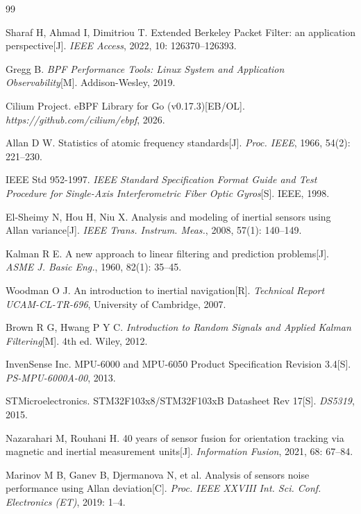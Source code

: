 \documentclass{rjthesis}
\begin{document}
\begin{thebibliography}{99}

 Sharaf H, Ahmad I, Dimitriou T. Extended Berkeley Packet Filter: an application perspective[J]. \textit{IEEE Access}, 2022, 10: 126370--126393.

 Gregg B. \textit{BPF Performance Tools: Linux System and Application Observability}[M]. Addison-Wesley, 2019.

 Cilium Project. eBPF Library for Go (v0.17.3)[EB/OL]. \textit{https://github.com/cilium/ebpf}, 2026.

 Allan D W. Statistics of atomic frequency standards[J]. \textit{Proc. IEEE}, 1966, 54(2): 221--230.

 IEEE Std 952-1997. \textit{IEEE Standard Specification Format Guide and Test Procedure for Single-Axis Interferometric Fiber Optic Gyros}[S]. IEEE, 1998.

 El-Sheimy N, Hou H, Niu X. Analysis and modeling of inertial sensors using Allan variance[J]. \textit{IEEE Trans. Instrum. Meas.}, 2008, 57(1): 140--149.

 Kalman R E. A new approach to linear filtering and prediction problems[J]. \textit{ASME J. Basic Eng.}, 1960, 82(1): 35--45.

 Woodman O J. An introduction to inertial navigation[R]. \textit{Technical Report UCAM-CL-TR-696}, University of Cambridge, 2007.

 Brown R G, Hwang P Y C. \textit{Introduction to Random Signals and Applied Kalman Filtering}[M]. 4th ed. Wiley, 2012.

 InvenSense Inc. MPU-6000 and MPU-6050 Product Specification Revision 3.4[S]. \textit{PS-MPU-6000A-00}, 2013.

 STMicroelectronics. STM32F103x8/STM32F103xB Datasheet Rev 17[S]. \textit{DS5319}, 2015.

 Nazarahari M, Rouhani H. 40 years of sensor fusion for orientation tracking via magnetic and inertial measurement units[J]. \textit{Information Fusion}, 2021, 68: 67--84.

 Marinov M B, Ganev B, Djermanova N, et al. Analysis of sensors noise performance using Allan deviation[C]. \textit{Proc. IEEE XXVIII Int. Sci. Conf. Electronics (ET)}, 2019: 1--4.


\end{thebibliography}
\end{document}

